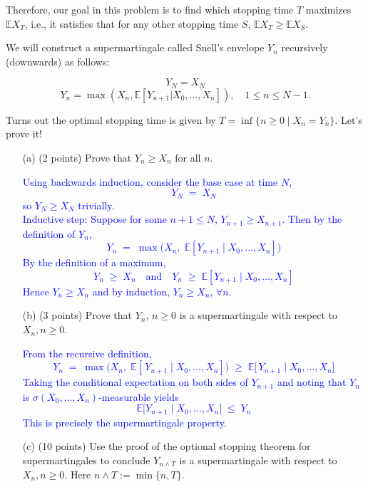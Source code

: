 \documentclass{article}
\begin{document}
Therefore, our goal in this problem is to find which stopping time $T$ maximizes $\mathbb{E}X_T$, i.e., it satisfies that for any other stopping time $S$, $\mathbb{E}X_T \geq \mathbb{E}X_S$.

We will construct a supermartingale called Snell’s envelope $Y_n$ recursively (downwards) as follows:

\[
Y_N = X_N
\]
\[
Y_n = \max(X_n, \mathbb{E}[Y_{n+1} | X_0, \ldots, X_n]), \quad 1 \leq n \leq N-1.
\]

Turns out the optimal stopping time is given by $T = \inf\{n \geq 0 \mid X_n = Y_n\}$. Let’s prove it!

\begin{enumerate}
    \item[(a)] (2 points) Prove that $Y_n \geq X_n$ for all $n$.

        \textcolor{blue}{
\noindent
Using backwards induction, consider the base case at time $N$,
\[
Y_N \;=\; X_N
\]
so $Y_N \geq X_N$ trivially. \\
\noindent
Inductive step: Suppose for some $n+1\le N$, $Y_{n+1}\ge X_{n+1}$. Then by the definition of $Y_n$,
\[
Y_n
\;=\;
\max\bigl(X_n,\;\mathbb{E}[Y_{n+1}\mid X_0,\ldots,X_n]\bigr)
\]
By the definition of a maximum,
\[
Y_n \;\geq\; X_n
\quad\text{and}\quad
Y_n \;\geq\; \mathbb{E}[Y_{n+1}\mid X_0,\ldots,X_n]
\]
Hence $Y_n \ge X_n$ and by induction, $Y_n \geq X_n$, $\forall n$.
}
    
    \item[(b)] (3 points) Prove that $Y_n$, $n \geq 0$ is a supermartingale with respect to $X_n, n \geq 0$.
    
        \textcolor{blue}{
From the recursive definition,
\[
Y_n
\;=\;
\max\bigl(X_n,\;\mathbb{E}[\,Y_{n+1}\mid X_0,\ldots,X_n]\bigr)
\;\geq\;
\mathbb{E}\bigl[\,Y_{n+1}\mid X_0,\ldots,X_n\bigr]
\]
Taking the conditional expectation on both sides of $Y_{n+1}$ and noting that $Y_n$ is $\sigma(X_0,\ldots,X_n)$-measurable yields
\[
\mathbb{E}\bigl[Y_{n+1}\mid X_0,\ldots,X_n\bigr]
\;\le\;
Y_n
\]
This is precisely the supermartingale property. 
        }

    \item[(c)] (10 points) Use the proof of the optional stopping theorem for supermartingales to conclude $Y_{n \wedge T}$ is a supermartingale with respect to $X_n, n \geq 0$. Here $n \wedge T := \min\{n, T\}$.


\end{enumerate}
\end{document}
